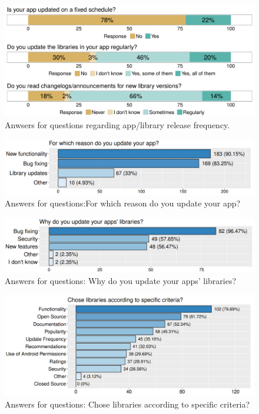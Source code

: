\documentclass[pdf,bookmarks,colorlinks=true]{IEEEtran}
\begin{document}
\begin{figure}[h]
	\centering
	\includegraphics[scale=0.30]{IsYourAppUpdatedFixedSchedule.png}
	\caption{Anwsers for questions regarding app/library release frequency.}
	\label{IsYourAppUpdatedFixedSchedule}
\end{figure}
\begin{figure}[h]
	\centering
	\includegraphics[scale=0.35]{ForWhichReasonUpdate.png}
	\caption{Answers for questions:For which reason do you update your app?}
	\label{ForWhichReasonUpdate}
\end{figure}
\begin{figure}[h]
	\centering
	\includegraphics[scale=0.35]{WhyDoYouUpdateYourLibrary.png}
	\caption{Answers for questions: Why do you update your apps' libraries?}
	\label{WhyDoYouUpdateYourLibrary}
\end{figure}
\begin{figure}[h]
	\centering
	\includegraphics[scale=0.30]{LibrarySelectionCriteria.png}
	\caption{Answers for questions: Chose libraries according to specific criteria?}
	\label{LibrarySelectionCriteria}
\end{figure}
\end{document}
